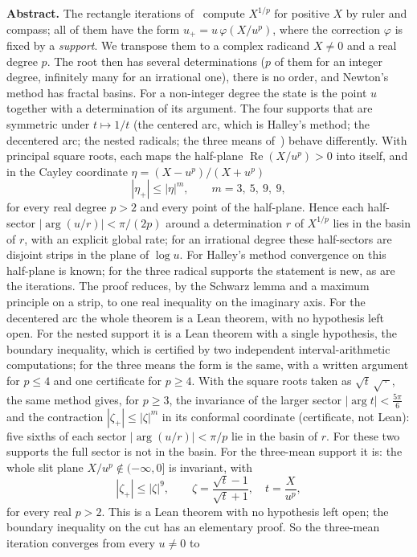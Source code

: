 \documentclass[10pt,a4paper]{article}
\theoremstyle{plain}
\theoremstyle{remark}
\numberwithin{equation}{section}
\DeclareMathOperator{\re}{Re}\DeclareMathOperator{\im}{Im}
\begin{document}
\textbf{Abstract.}
The rectangle iterations of~\cite{v28,v29} compute $X^{1/p}$ for positive $X$ by ruler and compass; all
of them have the form $u_+=u\,\varphi(X/u^{p})$, where the correction $\varphi$ is fixed by a
\emph{support}. We transpose them to a complex radicand $X\neq0$ and a real degree $p$. The root
then has several determinations ($p$ of them for an integer degree, infinitely many for an
irrational one), there is no order, and Newton's method has fractal basins. For a non-integer
degree the state is the point $u$ together with a determination of its argument. The four supports
that are
symmetric under $t\mapsto1/t$ (the centered arc, which is Halley's method; the decentered arc; the
nested radicals; the three means of~\cite{v29}) behave differently. With principal square roots, each
maps the half-plane $\re(X/u^{p})>0$ into itself, and in the Cayley coordinate
$\eta=(X-u^{p})/(X+u^{p})$
\[
  |\eta_{+}|\le|\eta|^{m},\qquad m=3,\ 5,\ 9,\ 9,
\]
for every real degree $p>2$ and every point of the half-plane. Hence each half-sector
$|\arg(u/r)|<\pi/(2p)$ around a determination $r$ of $X^{1/p}$ lies in the basin of $r$, with an
explicit global rate; for an irrational degree these half-sectors are disjoint strips in the plane
of $\log u$.
For Halley's method convergence on this half-plane is known; for the three radical supports the
statement is new, as are the iterations. The proof reduces, by the Schwarz lemma and a maximum
principle on a strip, to one real inequality on the imaginary axis. For the decentered arc the whole theorem is a Lean theorem, with no hypothesis left open. For the
nested support it is a Lean theorem with a single hypothesis, the boundary inequality, which is
certified by two independent interval-arithmetic computations; for the three means the form is the
same, with a written argument for $p\le4$ and one certificate for $p\ge4$. With the square roots taken as
$\sqrt t\,\sqrt{\,\cdot\,}$, the same method gives, for $p\ge3$, the invariance of the larger sector
$|\arg t|<\frac{5\pi}6$ and the contraction $|\zeta_+|\le|\zeta|^{m}$ in its conformal coordinate
(certificate, not Lean): five sixths of each sector $|\arg(u/r)|<\pi/p$ lie in the basin of $r$.
For these two supports the full sector is not in the basin. For the three-mean support it is: the
whole slit plane $X/u^{p}\notin(-\infty,0]$ is invariant, with
\[
  |\zeta_+|\le|\zeta|^{9},\qquad \zeta=\frac{\sqrt t-1}{\sqrt t+1},\quad t=\frac X{u^{p}},
\]
for every real $p>2$. This is a Lean theorem with no hypothesis left open; the boundary inequality
on the cut has an elementary proof. So the three-mean iteration converges from every $u\neq0$ to
\end{document}
